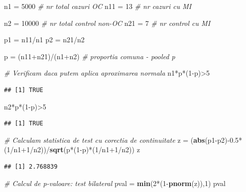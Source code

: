 \documentclass[]{article}
\newenvironment{Shaded}{\begin{snugshade}}{\end{snugshade}}
\newcommand{\KeywordTok}[1]{\textcolor[rgb]{0.13,0.29,0.53}{\textbf{{#1}}}}
\newcommand{\DecValTok}[1]{\textcolor[rgb]{0.00,0.00,0.81}{{#1}}}
\newcommand{\FloatTok}[1]{\textcolor[rgb]{0.00,0.00,0.81}{{#1}}}
\newcommand{\StringTok}[1]{\textcolor[rgb]{0.31,0.60,0.02}{{#1}}}
\newcommand{\CommentTok}[1]{\textcolor[rgb]{0.56,0.35,0.01}{\textit{{#1}}}}
\newcommand{\NormalTok}[1]{{#1}}
\begin{document}
\begin{Shaded}
\begin{Highlighting}[]
\NormalTok{n1 =}\StringTok{ }\DecValTok{5000} \CommentTok{# nr total cazuri OC}
\NormalTok{n11 =}\StringTok{ }\DecValTok{13} \CommentTok{# nr cazuri cu MI}

\NormalTok{n2 =}\StringTok{ }\DecValTok{10000} \CommentTok{# nr total control non-OC}
\NormalTok{n21 =}\StringTok{ }\DecValTok{7} \CommentTok{# nr control cu MI}

\NormalTok{p1 =}\StringTok{ }\NormalTok{n11/n1}
\NormalTok{p2 =}\StringTok{ }\NormalTok{n21/n2}

\NormalTok{p =}\StringTok{ }\NormalTok{(n11+n21)/(n1+n2) }\CommentTok{# proportia comuna - pooled p}

\CommentTok{# Verificam daca putem aplica aproximarea normala }
\NormalTok{n1*p*(}\DecValTok{1}\NormalTok{-p)>}\DecValTok{5}
\end{Highlighting}
\end{Shaded}

\begin{verbatim}
## [1] TRUE
\end{verbatim}

\begin{Shaded}
\begin{Highlighting}[]
\NormalTok{n2*p*(}\DecValTok{1}\NormalTok{-p)>}\DecValTok{5}
\end{Highlighting}
\end{Shaded}

\begin{verbatim}
## [1] TRUE
\end{verbatim}

\begin{Shaded}
\begin{Highlighting}[]
\CommentTok{# Calculam statistica de test cu corectia de continuitate}
\NormalTok{z =}\StringTok{ }\NormalTok{(}\KeywordTok{abs}\NormalTok{(p1-p2)-}\FloatTok{0.5}\NormalTok{*(}\DecValTok{1}\NormalTok{/n1}\DecValTok{+1}\NormalTok{/n2))/}\KeywordTok{sqrt}\NormalTok{(p*(}\DecValTok{1}\NormalTok{-p)*(}\DecValTok{1}\NormalTok{/n1}\DecValTok{+1}\NormalTok{/n2))}
\NormalTok{z}
\end{Highlighting}
\end{Shaded}

\begin{verbatim}
## [1] 2.768839
\end{verbatim}

\begin{Shaded}
\begin{Highlighting}[]
\CommentTok{# Calcul de p-valoare: test bilateral}
\NormalTok{pval =}\StringTok{ }\KeywordTok{min}\NormalTok{(}\DecValTok{2}\NormalTok{*(}\DecValTok{1}\NormalTok{-}\KeywordTok{pnorm}\NormalTok{(z)),}\DecValTok{1}\NormalTok{)}
\NormalTok{pval}
\end{Highlighting}
\end{Shaded}
\end{document}
